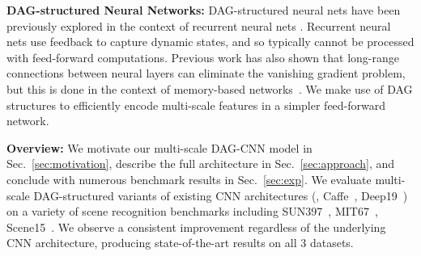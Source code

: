 \documentclass[10pt,twocolumn,letterpaper]{article}
\begin{document}

{\bf DAG-structured Neural Networks:} DAG-structured neural nets have been previously explored in the context of recurrent neural nets \cite{baldi2003principled,graves2009offline}. Recurrent neural nets use feedback to capture dynamic states, and so typically cannot be processed with feed-forward computations. Previous work has also shown that long-range connections between neural layers can eliminate the vanishing gradient problem, but this is done in the context of memory-based networks~\cite{hochreiter1997long}. We make use of DAG structures to efficiently encode multi-scale features in a simpler feed-forward network.

{\bf Overview:} We motivate our multi-scale DAG-CNN model in Sec.~\ref{sec:motivation}, describe the full architecture in Sec.~\ref{sec:approach}, and conclude with numerous benchmark results in Sec.~\ref{sec:exp}. We evaluate multi-scale DAG-structured variants of existing CNN architectures (\eg, Caffe~\cite{Caffe}, Deep19~\cite{veryDeep}) on a variety of scene recognition benchmarks including SUN397~\cite{SUN397}, MIT67~\cite{MIT67}, Scene15~\cite{Scene15}. We observe a consistent improvement regardless of the underlying CNN architecture, producing state-of-the-art results on all 3 datasets.
\end{document}
